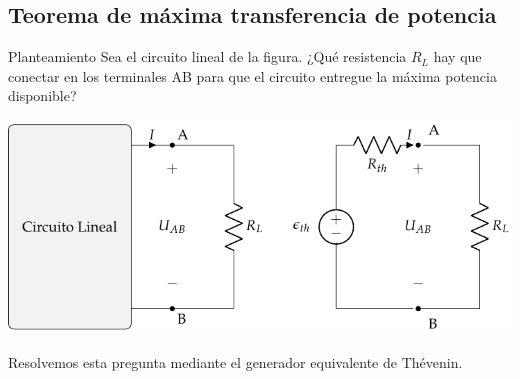 \documentclass[aspectratio=169, usenames,svgnames,dvipsnames]{beamer}
\begin{document}
\subsection{Teorema de máxima transferencia de potencia}
\label{sec:org717087b}

\begin{frame}[label={sec:orgad97e3a}]{Planteamiento}
Sea el circuito lineal de la figura. ¿Qué resistencia \(R_L\) hay que conectar en los terminales AB para que el circuito entregue la máxima potencia disponible?

\begin{center}
\includegraphics[height=0.55\textheight]{../figs/EquivalenteThevenin_R.pdf}
\end{center}

Resolvemos esta pregunta mediante el generador equivalente de Thévenin.
\end{frame}
\end{document}
